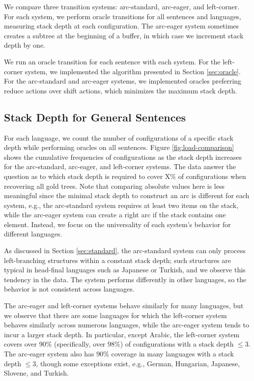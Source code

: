 \documentclass[english]{jnlp_1.4}
\begin{document}
We compare three transition systems: arc-standard, arc-eager, and left-corner.
For each system, we perform oracle transitions for all sentences and languages, measuring stack depth at each configuration.
The arc-eager system sometimes creates a subtree at the beginning of a buffer, in which case we increment stack depth by one.

We run an oracle transition for each sentence with each system.
For the left-corner system, we implemented the algorithm presented in Section \ref{sec:oracle}.
For the arc-standard and arc-eager systems, we implemented oracles preferring reduce actions over shift actions, which minimizes the maximum stack depth.


\subsection{Stack Depth for General Sentences}
\label{sec:analysis:general}

For each language, we count the number of configurations of a specific stack depth while performing oracles on all sentences.
Figure \ref{fig:load-comparison} shows the cumulative frequencies of configurations as the stack depth increases for the arc-standard, arc-eager, and left-corner systems.
The data answer the question as to which stack depth is required to cover X\% of configurations when recovering all gold trees.
Note that comparing absolute values here is less meaningful since the minimal stack depth to construct an arc is different for each system, e.g., the arc-standard system requires at least two items on the stack, while the arc-eager system can create a right arc if the stack contains one element.
Instead, we focus on the universality of each system's behavior for different languages.

As discussed in Section \ref{sec:standard}, the arc-standard system can only process left-branching structures within a constant stack depth;
such structures are typical in head-final languages such as Japanese or Turkish, and we observe this tendency in the data.
The system performs differently in other languages, so the behavior is not consistent across languages.

The arc-eager and left-corner systems behave similarly for many languages, but we observe that there are some languages for which the left-corner system behaves similarly across numerous languages, while the arc-eager system tends to incur a larger stack depth.
In particular, except Arabic, the left-corner system covers over 90\% (specifically, over 98\%) of configurations with a stack depth $\leq 3$.
The arc-eager system also has 90\% coverage in many languages with a stack depth $\leq 3$, though some exceptions exist, e.g., German, Hungarian, Japanese, Slovene, and Turkish.
\end{document}
